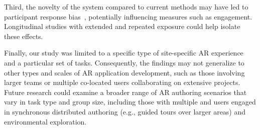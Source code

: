Third, the novelty of the system compared to current methods may have led to participant response bias~\cite{dellYoursBetterParticipant2012}, potentially influencing measures such as engagement. Longitudinal studies with extended and repeated exposure could help isolate these effects.

Finally, our study was limited to a specific type of site-specific AR experience and a particular set of tasks. Consequently, the findings may not generalize to other types and scales of AR application development, such as those involving larger teams or multiple co-located users collaborating on extensive projects. Future research could examine a broader range of AR authoring scenarios that vary in task type and group size, including those with multiple \insitu and \exsitu users engaged in synchronous distributed authoring (e.g., guided tours over larger areas) and environmental exploration.
